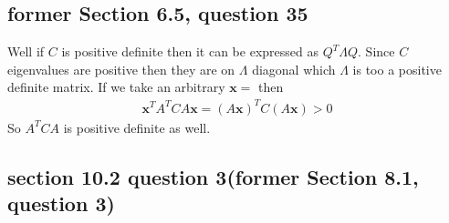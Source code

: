 \documentclass[a4paper,11pt]{article}
\newcommand{\mybf}[1]{\boldsymbol{#1}}
\newcommand{\?}{\stackrel{?}{=}}
\begin{document}
\subsection*{former Section 6.5, question 35}
Well if $C$ is positive definite then it can be expressed as $Q^T\Lambda{Q}$. Since $C$ eigenvalues are positive then they are on $\Lambda$ diagonal which $\Lambda$ is too a positive definite matrix. 
If we take an arbitrary $\mybf{x}=$ then
\begin{align*}
\mybf{x}^TA^TCA\mybf{x}=(A\mybf{x})^TC(A\mybf{x})>0
\end{align*}
So $A^TCA$ is positive definite as well.
\subsection*{section 10.2 question 3(former Section 8.1, question 3)}
\end{document}
